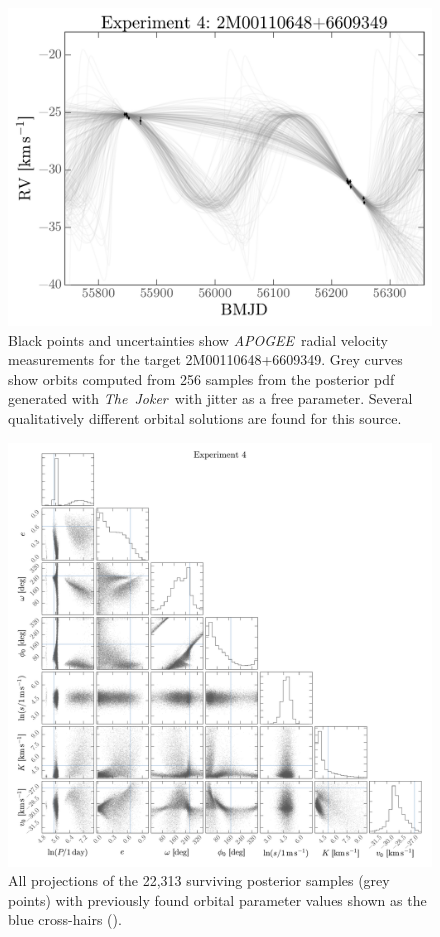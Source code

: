 \documentclass[manuscript, letterpaper]{aastex6}
\newcommand{\project}[1]{\textsl{#1}}
\newcommand{\acronym}[1]{{\small{#1}}}
\newcommand{\apogee}{\project{\acronym{APOGEE}}}
\newcommand{\samplername}{\project{The~Joker}}
\begin{document}
\begin{figure}[p]
\begin{center}
\includegraphics[width=\textwidth]{figures/apogee-rv-curves.pdf}
\end{center}
\caption{%
Black points and uncertainties show \apogee\ radial velocity measurements for
the target 2M00110648+6609349.
Grey curves show orbits computed from 256 samples from the posterior pdf
generated with \samplername\ with jitter as a free parameter.
Several qualitatively different orbital solutions are found for this source.
\label{fig:apogee-rv}}
\end{figure}

\begin{figure}[p]
\begin{center}
\includegraphics[width=\textwidth]{figures/apogee-corner.pdf}
\end{center}
\caption{%
All projections of the 22,313 surviving posterior samples (grey points) with
previously found orbital parameter values shown as the blue cross-hairs
(\citealt{Troup:2016}).
\label{fig:apogee-corner}}
\end{figure}
\end{document}
